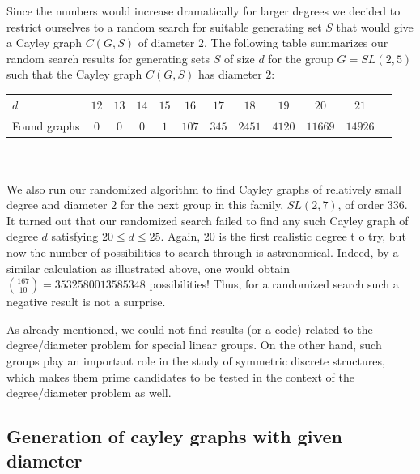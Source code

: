 \documentclass[a4paper,12pt,oneside]{report}%
\begin{document}
 
Since the numbers would increase dramatically for larger degrees we decided to restrict ourselves to a random search for suitable generating set $S$ that would give     a Cayley graph $C(G,S)$ of diameter $2$. The following table summarizes our random search results for generating sets $S$ of size $d$ for the group $G=SL(2,5)$ such     that the Cayley graph $C(G,S)$ has diameter $2$:
 
 
\begin{tabular}[htbp]{l*{10}{c}r}
     $d$ & $12$ & $13$ & $14$ & $15$ & $16$ & $17$ & $18$ & $19$ & $20$ & $21$ \\
\hline
     Found graphs & $0$ & $0$  & $0$ & $1$ & $107$ & $345$ & $2451$  & $4120$ & $11669$ & $14926$ \\
\end{tabular} \\ \\
 
We also run our randomized algorithm to find Cayley graphs of relatively small degree and diameter $2$ for the next group in this family, $SL(2,7)$, of order $336$.     It turned out that our randomized search failed to find any such Cayley graph of degree $d$ satisfying $20 \le d \le 25$. Again, $20$ is the first realistic degree t    o try, but now the number of possibilities to search through is astronomical. Indeed, by a similar calculation as illustrated above, one would obtain ${167\choose 10    } = 3532580013585348 $ possibilities! Thus,  for a randomized search such a negative result is not a surprise.
 
As already mentioned, we could not find results (or a code) related to the degree/diameter problem for special linear groups. On the other hand, such groups play an     important role in the study of symmetric discrete structures, which makes them prime candidates to be tested in the context of the degree/diameter problem as well.

\lstset{
	basicstyle=\footnotesize,
	tabsize=2
}

\subsection{Generation of cayley graphs with given diameter}
\end{document}
